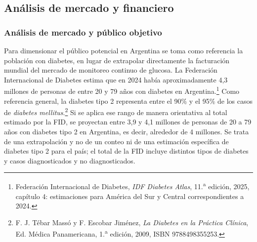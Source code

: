 \subsection{Análisis de mercado y financiero}




\subsubsection{Análisis de mercado y público objetivo}




Para dimensionar el público potencial en Argentina se toma como referencia la población con diabetes, en lugar de extrapolar directamente la facturación mundial del mercado de monitoreo continuo de glucosa. La Federación Internacional de Diabetes estima que en 2024 había aproximadamente 4,3 millones de personas de entre 20 y 79 años con diabetes en Argentina.\footnote{Federación Internacional de Diabetes, \textit{IDF Diabetes Atlas}, 11.\textsuperscript{a} edición, 2025, capítulo 4: estimaciones para América del Sur y Central correspondientes a 2024.} Como referencia general, la diabetes tipo 2 representa entre el 90\% y el 95\% de los casos de \textit{diabetes mellitus}.\footnote{F. J. Tébar Massó y F. Escobar Jiménez, \textit{La Diabetes en la Práctica Clínica}, Ed. Médica Panamericana, 1.\textsuperscript{a} edición, 2009, ISBN 9788498355253.} Si se aplica ese rango de manera orientativa al total estimado por la FID, se proyectan entre 3,9 y 4,1 millones de personas de 20 a 79 años con diabetes tipo 2 en Argentina, es decir, alrededor de 4 millones. Se trata de una extrapolación y no de un conteo ni de una estimación específica de diabetes tipo 2 para el país; el total de la FID incluye distintos tipos de diabetes y casos diagnosticados y no diagnosticados.

